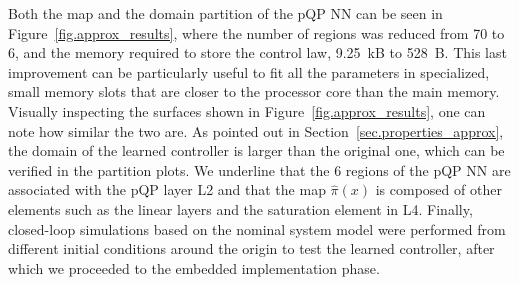 Both the map and the domain partition of the pQP NN can be seen in Figure~\ref{fig.approx_results}, where the number of regions was reduced from 70 to 6, and the memory required to store the control law, 9.25~kB to 528~B. This last improvement can be particularly useful to fit all the parameters in specialized, small memory slots that are closer to the processor core than the main memory. Visually inspecting the surfaces shown in Figure~\ref{fig.approx_results}, one can note how similar the two are. As pointed out in Section~\ref{sec.properties_approx}, the domain of the learned controller is larger than the original one, which can be verified in the partition plots. We underline that the 6 regions of the pQP NN are associated with the pQP layer L2 and that the map $\hat\pi(x)$ is composed of other elements such as the linear layers and the saturation element in L4. Finally, closed-loop simulations based on the nominal system model were performed from different initial conditions around the origin to test the learned controller, after which we proceeded to the embedded implementation phase.

%

